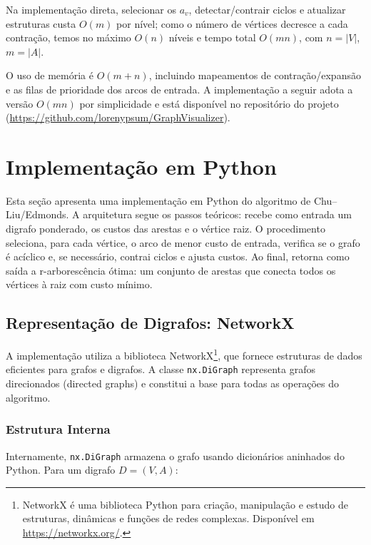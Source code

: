 Na implementação direta, selecionar os \(a_v\), detectar/contrair ciclos e atualizar estruturas custa \(O(m)\) por nível; como o número de vértices decresce a cada contração, temos no máximo \(O(n)\) níveis e tempo total \(O(mn)\), com \(n=|V|\), \(m=|A|\).



O uso de memória é \(O(m+n)\), incluindo mapeamentos de contração/expansão e as filas de prioridade dos arcos de entrada. A implementação a seguir adota a versão \(O(mn)\) por simplicidade e está disponível no repositório do projeto (\url{https://github.com/lorenypsum/GraphVisualizer}).

\section{Implementação em Python}

Esta seção apresenta uma implementação em Python do algoritmo de Chu–Liu/Edmonds. A arquitetura segue os passos teóricos: recebe como entrada um digrafo ponderado, os custos das arestas e o vértice raiz. O procedimento seleciona, para cada vértice, o arco de menor custo de entrada, verifica se o grafo é acíclico e, se necessário, contrai ciclos e ajusta custos. Ao final, retorna como saída a r-arborescência ótima: um conjunto de arestas que conecta todos os vértices à raiz com custo mínimo.

\subsection{Representação de Digrafos: NetworkX}

A implementação utiliza a biblioteca NetworkX\footnote{NetworkX é uma biblioteca Python para criação, manipulação e estudo de estruturas, dinâmicas e funções de redes complexas. Disponível em \url{https://networkx.org/}.}, que fornece estruturas de dados eficientes para grafos e digrafos. A classe \texttt{nx.DiGraph} representa grafos direcionados (directed graphs) e constitui a base para todas as operações do algoritmo.

\subsubsection{Estrutura Interna}

Internamente, \texttt{nx.DiGraph} armazena o grafo usando dicionários aninhados do Python. Para um digrafo \(D=(V,A)\):

